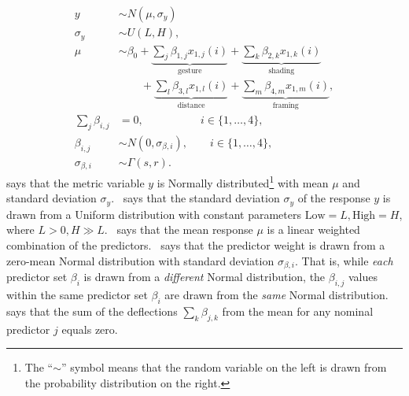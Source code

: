 \begin{align}
 y                  & \sim N(\mu, \sigma_y)                    \label{eq:response-main}                       \\
 \sigma_y           & \sim U(L, H), \label{eq:main-sigma}                                                     \\
 \mu                & \sim \beta_0 +
 \underbrace{\sum_{j} \beta_{1,j} x_{1,j}(i)}_{\text{gesture}} +
 \underbrace{\sum_k \beta_{2,k} x_{1,k}(i)}_{\text{shading}}  \nonumber \\
 & \qquad  + \underbrace{\sum_l \beta_{3,l} x_{1,l}(i)}_{\text{distance}} +
 \underbrace{\sum_m \beta_{4,m} x_{1,m}(i)}_{\text{framing}} ,                  \label{eq:mu-main} \\
 \sum_j \beta_{i,j} & = 0, \qquad  \qquad  \quad \, i \in \{1, \ldots, 4\}, \label{eq:beta-equality}          \\
 \beta_{i,j}        & \sim N(0, \sigma_{\beta, i}), \qquad  i \in \{1, \ldots, 4\},\label{eq:main-beta-sigma} \\
 \sigma_{\beta, i}  & \sim \Gamma(s, r ). \label{eq:gamma-distribution}
\end{align}
 says that the metric variable $y$ is Normally distributed\footnote{The ``$\sim$'' symbol means that the random variable on the left is drawn from the probability distribution on the right.} with mean $\mu$ and standard deviation $\sigma_y$.~ says that the standard deviation $\sigma_y$ of the response $y$ is drawn from a Uniform distribution with constant parameters $\text{Low}=L, \text{High}=H$, where $L>0, H\gg L$.~ says that the mean response $\mu$ is a linear weighted combination of the predictors.~ says that the predictor weight is drawn from a zero-mean Normal distribution with standard deviation $\sigma_{\beta, i}$. That is,  while \textit{each} predictor set $\beta_{i}$ is drawn from a \textit{different} Normal distribution, the $\beta_{i,j}$ values within the same predictor set $\beta_{i}$ are drawn from the \textit{same} Normal distribution.~ says that the sum of the deflections $\sum_k \beta_{j,k}$ from the mean for any nominal predictor $j$ equals zero.


